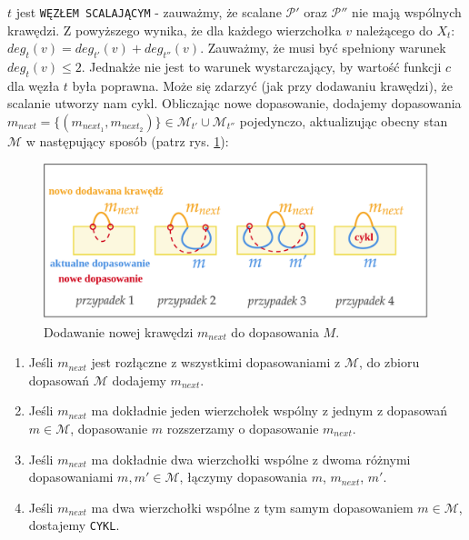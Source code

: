 \documentclass[12pt, oneside]{report}
\begin{document}
\newline\newline
$t$ jest \texttt{WĘZŁEM SCALAJĄCYM} - zauważmy, że scalane $\mathcal{P}'$ oraz $\mathcal{P}''$ nie mają wspólnych krawędzi. Z powyższego wynika, że dla każdego wierzchołka $v$ należącego do $X_t$: $deg_t(v) = deg_{t'}(v) + deg_{t''}(v)$. Zauważmy, że musi być spełniony warunek $deg_t(v) \leq 2$.  Jednakże nie jest to warunek wystarczający, by wartość funkcji $c$ dla węzła $t$ była poprawna. Może się zdarzyć (jak przy dodawaniu krawędzi), że scalanie utworzy nam cykl. Obliczając nowe dopasowanie, dodajemy dopasowania $m_{next} = \{(m_{next_1}, m_{next_2})\} \in \mathcal{M}_{t'} \cup \mathcal{M}_{t''}$ pojedynczo, aktualizując obecny stan $\mathcal{M}$ w następujący sposób (patrz rys. \ref{hamiltonian_merge}):

\begin{figure}
\centering
\includegraphics[width=16cm]{hamiltonian_merge.png}
\caption{Dodawanie nowej krawędzi $m_{next}$ do dopasowania $M$.}
\label{hamiltonian_merge}
\end{figure}

\begin{enumerate}
\item {Jeśli $m_{next}$ jest rozłączne z wszystkimi dopasowaniami z $\mathcal{M}$, do zbioru dopasowań $\mathcal{M}$ dodajemy $m_{next}$.}
\item {Jeśli $m_{next}$ ma dokładnie jeden wierzchołek wspólny z jednym z dopasowań $m \in \mathcal{M}$, dopasowanie $m$ rozszerzamy o dopasowanie $m_{next}$.}
\item {Jeśli $m_{next}$ ma dokładnie dwa wierzchołki wspólne z dwoma różnymi dopasowaniami $m, m' \in \mathcal{M}$, łączymy dopasowania $m$, $m_{next}$, $m'$.}
\item {Jeśli $m_{next}$ ma dwa wierzchołki wspólne z tym samym dopasowaniem $m \in \mathcal{M}$, dostajemy \texttt{CYKL}.}
\end{enumerate}
\end{document}
